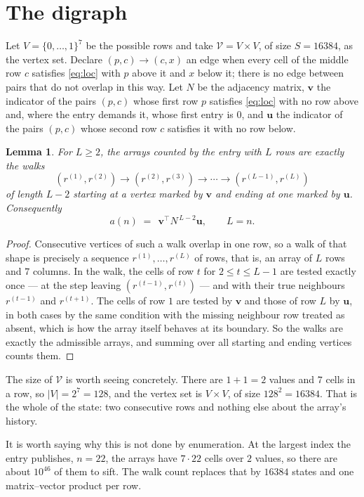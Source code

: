 \documentclass[11pt,a4paper]{article}
\theoremstyle{plain}
\newtheorem{lemma}[theorem]{Lemma}
\theoremstyle{definition}
\begin{document}
\section{The digraph}

Let $V=\{0,\dots,1\}^{7}$ be the possible rows and take
$\mathcal V=V\times V$, of size $S=16384$, as the vertex set. Declare $(p,c)\to(c,x)$ an edge
when every cell of the middle row $c$ satisfies \eqref{eq:loc} with $p$ above it and $x$
below it; there is no edge between pairs that do not overlap in this way. Let $N$ be the
adjacency matrix, $\mathbf{v}$ the indicator of the pairs $(p,c)$ whose first row $p$
satisfies \eqref{eq:loc} with no row above and, where the entry demands it, whose first entry is $0$, and $\mathbf{u}$ the indicator of
the pairs $(p,c)$ whose second row $c$ satisfies it with no row below.

\begin{lemma}\label{lem:walk}
For $L\ge2$, the arrays counted by the entry with $L$ rows are exactly the walks
\[
(r^{(1)},r^{(2)})\to(r^{(2)},r^{(3)})\to\cdots\to(r^{(L-1)},r^{(L)})
\]
of length $L-2$ starting at a vertex marked by $\mathbf{v}$ and ending at one marked by
$\mathbf{u}$. Consequently
\[
a(n)\;=\;\,\mathbf{v}^{\!\top}N^{\,L-2}\mathbf{u},\qquad L=n .
\]
\end{lemma}

\begin{proof}
Consecutive vertices of such a walk overlap in one row, so a walk of that shape is
precisely a sequence $r^{(1)},\dots,r^{(L)}$ of rows, that is, an array of $L$ rows
and $7$ columns. In the walk, the cells of row $t$ for $2\le t\le L-1$ are tested
exactly once --- at the step leaving $(r^{(t-1)},r^{(t)})$ --- and with their true
neighbours $r^{(t-1)}$ and $r^{(t+1)}$. The cells of row $1$ are tested by
$\mathbf{v}$ and those of row $L$ by $\mathbf{u}$, in both cases by the same condition
with the missing neighbour row treated as absent, which is how the array itself behaves at
its boundary. So the walks are exactly the admissible arrays, and summing over all starting
and ending vertices counts them.
\end{proof}


The size of $\mathcal V$ is worth seeing concretely. There are $1+1=2$ values
and $7$ cells in a row, so $|V|=2^{7}=128$, and the vertex set is
$V\times V$, of size $128^2=16384$. That is the whole of the state: two consecutive
rows and nothing else about the array's history.

It is worth saying why this is not done by enumeration. At the largest index the entry
publishes, $n=22$, the arrays have $7\cdot22$ cells over
$2$ values, so there are about $10^{46}$ of them to sift. The
walk count replaces that by $16384$ states and one matrix--vector product per row.
\end{document}
